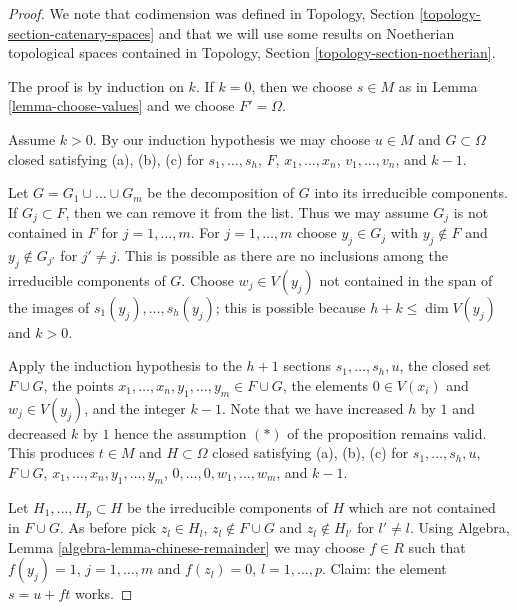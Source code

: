 \documentclass[10pt,a4paper]{amsart}
\theoremstyle{plain}
\theoremstyle{definition}
\theoremstyle{remark}
\numberwithin{equation}{subsection}
\begin{document}
\begin{proof}
We note that codimension was defined in
Topology, Section \ref{topology-section-catenary-spaces}
and that we will use some results on Noetherian topological
spaces contained in
Topology, Section \ref{topology-section-noetherian}.

\medskip\noindent
The proof is by induction on $k$. If $k = 0$, then we choose
$s \in M$ as in Lemma \ref{lemma-choose-values} and we choose
$F' = \Omega$.

\medskip\noindent
Assume $k > 0$. By our induction hypothesis we may
choose $u \in M$ and $G \subset \Omega$ closed satisfying
(a), (b), (c) for $s_1, \ldots, s_h$, $F$, $x_1, \ldots, x_n$,
$v_1, \ldots, v_n$, and $k - 1$.

\medskip\noindent
Let $G = G_1 \cup \ldots \cup G_m$ be the decomposition of $G$ into
its irreducible components. If $G_j \subset F$, then we can remove
it from the list. Thus we may assume $G_j$ is not contained in $F$
for $j = 1, \ldots, m$.
For $j = 1, \ldots, m$ choose $y_j \in G_j$ with $y_j \not \in F$
and $y_j \not \in G_{j'}$ for $j' \not = j$. This is possible as
there are no inclusions among the irreducible components of $G$.
Choose $w_j \in V(y_j)$ not contained in the span of the images of
$s_1(y_j), \ldots, s_h(y_j)$; this is possible because
$h + k \leq \dim V(y_j)$ and $k > 0$.

\medskip\noindent
Apply the induction hypothesis to the $h + 1$ sections
$s_1, \ldots, s_h, u$, the closed set $F \cup G$,
the points $x_1, \ldots, x_n, y_1, \ldots, y_m \in F \cup G$,
the elements $0 \in V(x_i)$ and $w_j \in V(y_j)$, and
the integer $k - 1$. Note that we have increased $h$ by $1$ and
decreased $k$ by $1$ hence the assumption $(*)$ of the proposition
remains valid. This produces $t \in M$ and $H \subset \Omega$ closed
satisfying (a), (b), (c) for $s_1, \ldots, s_h, u$, $F \cup G$,
$x_1, \ldots, x_n, y_1, \ldots, y_m$, $0, \ldots, 0, w_1, \ldots, w_m$,
and $k - 1$.

\medskip\noindent
Let $H_1, \ldots, H_p \subset H$ be the irreducible components of $H$
which are not contained in $F \cup G$. As before pick $z_l \in H_l$,
$z_l \not \in F \cup G$ and $z_l \not \in H_{l'}$ for $l' \not = l$.
Using Algebra, Lemma \ref{algebra-lemma-chinese-remainder}
we may choose $f \in R$ such that
$f(y_j) = 1$, $j = 1, \ldots, m$ and $f(z_l) = 0$, $l = 1, \ldots, p$.
Claim: the element $s = u + f t$ works.


\end{proof}
\end{document}
